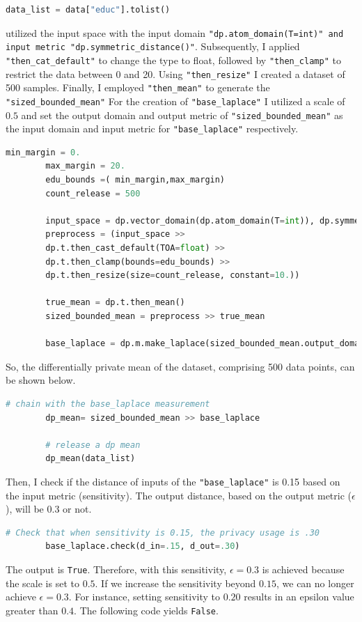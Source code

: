 \documentclass[12pt]{extarticle}
\begin{document}
	\begin{lstlisting}[language=Python]
		data_list = data["educ"].tolist()
	\end{lstlisting}
	 utilized the input space with the input domain \texttt{"dp.atom\_domain(T=int)" and input metric "dp.symmetric\_distance()"}. Subsequently, I applied \verb|"then_cat_default"| to change the type to float, followed by \verb|"then_clamp"| to restrict the data between 0 and 20. Using \verb|"then_resize"| I created a dataset of 500 samples. Finally, I employed \verb|"then_mean"| to generate the \verb|"sized_bounded_mean"| For the creation of \verb|"base_laplace"| I utilized a scale of $0.5$ and set the output domain and output metric of \verb|"sized_bounded_mean"| as the input domain and input metric for \verb|"base_laplace"| respectively.
	\begin{lstlisting}[language=Python]
		min_margin = 0.
		max_margin = 20.
		edu_bounds =( min_margin,max_margin)
		count_release = 500
		
		input_space = dp.vector_domain(dp.atom_domain(T=int)), dp.symmetric_distance()
		preprocess = (input_space >>
		dp.t.then_cast_default(TOA=float) >>
		dp.t.then_clamp(bounds=edu_bounds) >>
		dp.t.then_resize(size=count_release, constant=10.)) 
		
		true_mean = dp.t.then_mean() 
		sized_bounded_mean = preprocess >> true_mean
		
		base_laplace = dp.m.make_laplace(sized_bounded_mean.output_domain, sized_bounded_mean.output_metric, scale=0.5)
	\end{lstlisting}
	So, the differentially private mean of the dataset, comprising 500 data points, can be shown below.
	\begin{lstlisting}[language=Python]
		# chain with the base_laplace measurement
		dp_mean= sized_bounded_mean >> base_laplace
		
		# release a dp mean
		dp_mean(data_list)
	\end{lstlisting}
	Then, I check if the distance of inputs of the \texttt{"base\_laplace"} is 0.15 based on the input metric (sensitivity). The output distance, based on the output metric ($\epsilon$), will be 0.3 or not.
	\begin{lstlisting}[language=Python]
		# Check that when sensitivity is 0.15, the privacy usage is .30
		base_laplace.check(d_in=.15, d_out=.30)
	\end{lstlisting}
	The output is \texttt{True}. Therefore, with this sensitivity, $\epsilon=0.3$ is achieved because the scale is set to $0.5$. If we increase the sensitivity beyond $0.15$, we can no longer achieve $\epsilon=0.3$. For instance, setting sensitivity to $0.20$ results in an epsilon value greater than $0.4$. The following code yields \texttt{False}.
\end{document}
